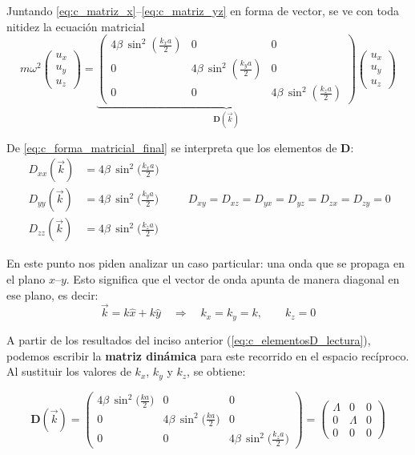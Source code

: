 \documentclass{article}
\begin{document}
Juntando \eqref{eq:c_matriz_x}–\eqref{eq:c_matriz_yz} en forma de vector, se ve con toda nitidez la ecuación matricial
\begin{equation}
m\omega^2
\begin{pmatrix}
u_x\\ u_y\\ u_z
\end{pmatrix}
=
\underbrace{\begin{pmatrix}
4\beta\,\sin^2(\tfrac{k_x a}{2}) & 0 & 0\\[4pt]
0 & 4\beta\,\sin^2(\tfrac{k_y a}{2}) & 0\\[4pt]
0 & 0 & 4\beta\,\sin^2(\tfrac{k_z a}{2})
\end{pmatrix}}_{\displaystyle \mathbf D(\vec k)}
\begin{pmatrix}
u_x\\ u_y\\ u_z
\end{pmatrix}
\label{eq:c_forma_matricial_final}
\end{equation}

De \eqref{eq:c_forma_matricial_final} se interpreta que los elementos de \(\mathbf D\):
\begin{equation}
\boxed{
\begin{aligned}
D_{xx}(\vec k)&=4\beta\,\sin^2\!\Big(\tfrac{k_x a}{2}\Big)\\[2pt]
D_{yy}(\vec k)&=4\beta\,\sin^2\!\Big(\tfrac{k_y a}{2}\Big)\\[2pt]
D_{zz}(\vec k)&=4\beta\,\sin^2\!\Big(\tfrac{k_z a}{2}\Big)
\end{aligned}}
\qquad
\boxed{\,D_{xy}=D_{xz}=D_{yx}=D_{yz}=D_{zx}=D_{zy}=0\,}
\label{eq:c_elementosD_lectura}
\end{equation}

\;

En este punto nos piden analizar un caso particular: una onda que se propaga en el plano \(x\text{–}y\).  
Esto significa que el vector de onda apunta de manera diagonal en ese plano, es decir:
\[
\vec k = k\hat x + k\hat y
\quad\Longrightarrow\quad
k_x = k_y = k, \qquad k_z = 0
\]

A partir de los resultados del inciso anterior (\eqref{eq:c_elementosD_lectura}), podemos escribir la \textbf{matriz dinámica} para este recorrido en el espacio recíproco.  
Al sustituir los valores de \(k_x\), \(k_y\) y \(k_z\), se obtiene:

\begin{equation}
\boxed{
\mathbf D(\vec k)=
\begin{pmatrix}
4\beta\,\sin^2\!\big(\tfrac{ka}{2}\big) & 0 & 0\\[4pt]
0 & 4\beta\,\sin^2\!\big(\tfrac{ka}{2}\big) & 0\\[4pt]
0 & 0 & 4\beta\,\sin^2\!\big(\tfrac{k_z a}{2}\big)
\end{pmatrix}
=
\begin{pmatrix}
\Lambda & 0 & 0\\[2pt]
0 & \Lambda & 0\\[2pt]
0 & 0 & 0
\end{pmatrix}
}
\label{eq:d_matriz_path}
\end{equation}
\end{document}
